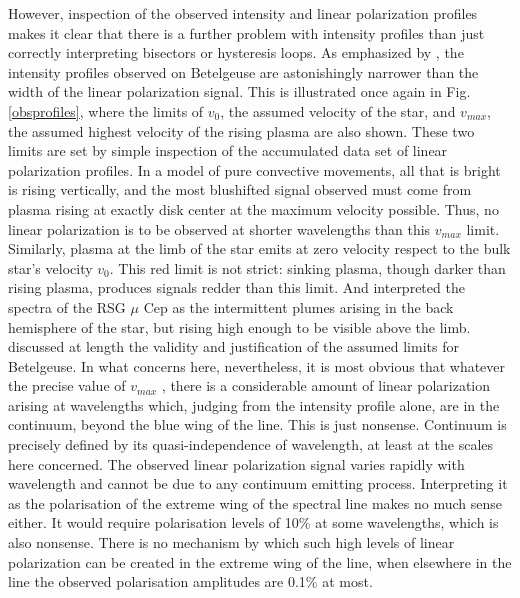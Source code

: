 \documentclass{/Users/art2/TeX/aanda/aa}
\begin{document}
However, inspection of the observed intensity and linear polarization profiles makes it clear that there is a further problem with intensity profiles 
than just correctly interpreting bisectors or hysteresis loops. As emphasized by \cite{lopez_ariste_three-dimensional_2022}, the intensity profiles observed on Betelgeuse are astonishingly 
narrower than the width of the linear polarization signal. This is illustrated once again in Fig. \ref{obsprofiles}, where the limits of $v_0$, the assumed velocity 
of the star, and $v_{max}$, the assumed highest velocity of the rising plasma are also shown. These two limits are set by simple inspection of the
accumulated data set of linear polarization profiles. In a model of pure convective movements, all that is bright is rising vertically, and the most 
blushifted signal observed must come from plasma rising at exactly disk center at the maximum velocity possible. Thus, no linear polarization is 
to be observed at shorter wavelengths than this $v_{max}$ limit. Similarly, plasma at the limb of the star emits at zero velocity respect to the 
bulk star's velocity $v_0$. This red limit is not strict: sinking plasma, though darker than rising plasma, produces signals redder than this limit. And 
\cite{muCep} interpreted the spectra of the RSG $\mu $ Cep as the intermittent plumes arising in the back hemisphere of the star, but rising high enough to 
be visible above the limb. \cite{lopez_ariste_three-dimensional_2022} discussed at length the validity and justification of the assumed limits for Betelgeuse.  In what concerns here, nevertheless, 
it is most obvious that whatever the precise value of $v_{max}$ , there is a considerable amount of linear polarization arising at wavelengths which, judging from the intensity profile alone, 
are in the continuum, beyond the blue 
wing of the line. This is just nonsense. Continuum is precisely defined by its quasi-independence of wavelength, at least at the 
scales here concerned. The observed linear polarization signal varies rapidly with wavelength and cannot be due to any continuum emitting process. Interpreting it as the polarisation of the extreme 
wing of the spectral line makes no much sense either. It would require polarisation levels of 10\% at some wavelengths, which is also nonsense. There is no 
mechanism by which such high levels of linear polarization can be created in the extreme wing of the line, when elsewhere in the line the observed polarisation amplitudes 
are  0.1\%  at most. 
\end{document}
